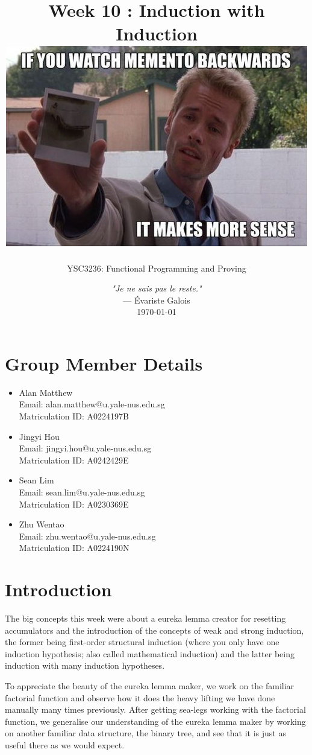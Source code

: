 \documentclass{article}
\title{
    \fontfamily{ebgaramond}\selectfont Week 10 : Induction with Induction \\
    \vspace{1cm}
    \includegraphics[width=0.8\linewidth]{download.jpeg}
}
\author{YSC3236: Functional Programming and Proving}
\date{%
    \small\emph{"Je ne sais pas le reste."} \\
    — Évariste Galois\\
    \vspace{1cm}
    \today
}
\begin{document}
\maketitle

\newpage
\section*{Group Member Details}
\begin{itemize}
    \item Alan Matthew \\
    Email: alan.matthew@u.yale-nus.edu.sg \\
    Matriculation ID: A0224197B

    \item Jingyi Hou \\
    Email: jingyi.hou@u.yale-nus.edu.sg \\
    Matriculation ID: A0242429E

    \item Sean Lim \\
    Email: sean.lim@u.yale-nus.edu.sg \\
    Matriculation ID: A0230369E

    \item Zhu Wentao \\
    Email: zhu.wentao@u.yale-nus.edu.sg \\
    Matriculation ID: A0224190N
\end{itemize}
\newpage
\tableofcontents
\newpage

\section{Introduction}

The big concepts this week were about a eureka lemma creator for resetting accumulators and the introduction of the concepts of weak and strong induction, the former being first-order structural induction (where you only have one induction hypothesis; also called mathematical induction) and the latter being induction with many induction hypotheses. 

To appreciate the beauty of the eureka lemma maker, we work on the familiar factorial function and observe how it does the heavy lifting we have done manually many times previously. After getting sea-legs working with the factorial function, we generalise our understanding of the eureka lemma maker by working on another familiar data structure, the binary tree, and see that it is just as useful there as we would expect.
\end{document}
